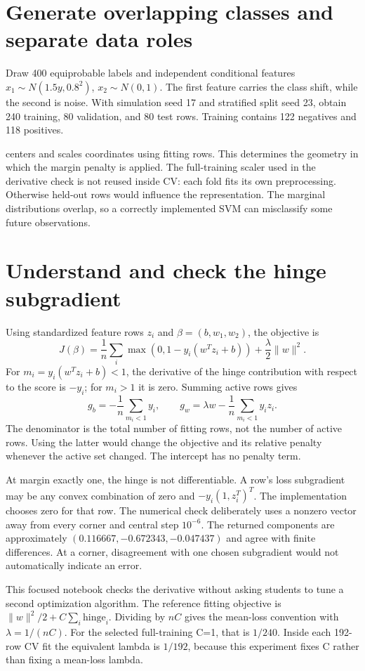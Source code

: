 \section{Generate overlapping classes and separate data roles}
Draw 400 equiprobable labels and independent conditional features $x_1\sim N(1.5y,0.8^2)$,
$x_2\sim N(0,1)$. The first feature carries the class shift, while the second is noise.
With simulation seed 17 and stratified split seed 23, obtain 240 training, 80 validation, and 80 test rows.
Training contains 122 negatives and 118 positives.

 centers and scales coordinates using fitting rows. This determines the geometry
in which the margin penalty is applied. The full-training scaler used in the derivative check is not reused
inside CV: each fold fits its own preprocessing. Otherwise held-out rows would influence the representation.
The marginal distributions overlap, so a correctly implemented SVM can misclassify some future observations.

\section{Understand and check the hinge subgradient}
Using standardized feature rows $z_i$ and $\beta=(b,w_1,w_2)$, the objective is
\[
J(\beta)=\frac1n\sum_i\max(0,1-y_i(w^Tz_i+b))+\frac\lambda2\|w\|^2.
\]
For $m_i=y_i(w^Tz_i+b)<1$, the derivative of the hinge contribution with respect to the score is $-y_i$;
for $m_i>1$ it is zero. Summing active rows gives
\[g_b=-\frac1n\sum_{m_i<1}y_i,\qquad
g_w=\lambda w-\frac1n\sum_{m_i<1}y_i z_i.\]
The denominator is the total number of fitting rows, not the number of active rows. Using the latter would
change the objective and its relative penalty whenever the active set changed. The intercept has no penalty term.

At margin exactly one, the hinge is not differentiable. A row's loss subgradient may be any convex combination
of zero and $-y_i(1,z_i^T)^T$. The implementation chooses zero for that row.
The numerical check deliberately uses a nonzero vector away from every corner and central step $10^{-6}$.
The returned components are approximately $(0.116667,-0.672343,-0.047437)$ and agree with finite differences.
At a corner, disagreement with one chosen subgradient would not automatically indicate an error.

This focused notebook checks the derivative without asking students to tune a second optimization algorithm.
The reference fitting objective is $\|w\|^2/2+C\sum_i\text{hinge}_i$.
Dividing by $nC$ gives the mean-loss convention with $\lambda=1/(nC)$.
For the selected full-training C=1, that is $1/240$. Inside each 192-row CV fit the equivalent lambda is $1/192$,
because this experiment fixes C rather than fixing a mean-loss lambda.

